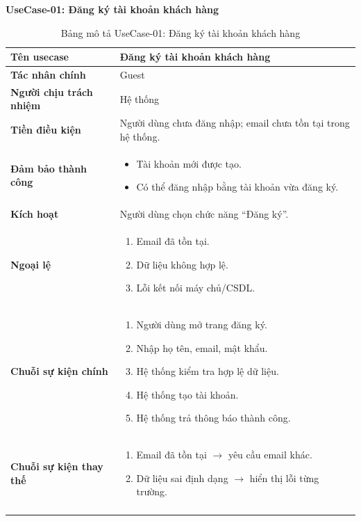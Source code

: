 \documentclass[13pt]{article}
\begin{document}
\textbf{UseCase-01: Đăng ký tài khoản khách hàng}
\renewcommand{\arraystretch}{1.25}
\begin{longtable}{|>{\bfseries}p{}|p{}|}
\hline
Tên usecase & Đăng ký tài khoản khách hàng \\ \hline
Tác nhân chính & Guest \\ \hline
Người chịu trách nhiệm & Hệ thống \\ \hline
Tiền điều kiện & Người dùng chưa đăng nhập; email chưa tồn tại trong hệ thống. \\ \hline
Đảm bảo thành công &
\begin{itemize}[leftmargin=*,nosep]
\item Tài khoản mới được tạo.
\item Có thể đăng nhập bằng tài khoản vừa đăng ký.
\end{itemize} \\ \hline
Kích hoạt & Người dùng chọn chức năng ``Đăng ký''. \\ \hline
Ngoại lệ &
\begin{enumerate}[leftmargin=*,nosep]
\item Email đã tồn tại.
\item Dữ liệu không hợp lệ.
\item Lỗi kết nối máy chủ/CSDL.
\end{enumerate} \\ \hline
Chuỗi sự kiện chính &
\begin{enumerate}[leftmargin=*,nosep]
\item Người dùng mở trang đăng ký.
\item Nhập họ tên, email, mật khẩu.
\item Hệ thống kiểm tra hợp lệ dữ liệu.
\item Hệ thống tạo tài khoản.
\item Hệ thống trả thông báo thành công.
\end{enumerate} \\ \hline
Chuỗi sự kiện thay thế &
\begin{enumerate}[leftmargin=*,nosep]
\item [3a.] Email đã tồn tại $\rightarrow$ yêu cầu email khác.
\item [3b.] Dữ liệu sai định dạng $\rightarrow$ hiển thị lỗi từng trường.
\end{enumerate} \\ \hline
\caption{Bảng mô tả UseCase-01: Đăng ký tài khoản khách hàng}
\end{longtable}
\end{document}
